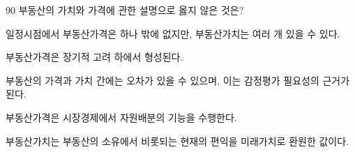 \begin{question}{90}
부동산의 가치와 가격에 관한 설명으로 옳지 않은 것은?
\begin{choices}
  \item 일정시점에서 부동산가격은 하나 밖에 없지만, 부동산가치는 여러 개 있을 수 있다.
  \item 부동산가격은 장기적 고려 하에서 형성된다.
  \item 부동산의 가격과 가치 간에는 오차가 있을 수 있으며, 이는 감정평가 필요성의 근거가 된다.
  \item 부동산가격은 시장경제에서 자원배분의 기능을 수행한다.
  \item 부동산가치는 부동산의 소유에서 비롯되는 현재의 편익을 미래가치로 환원한 값이다.
\end{choices}
\end{question}

